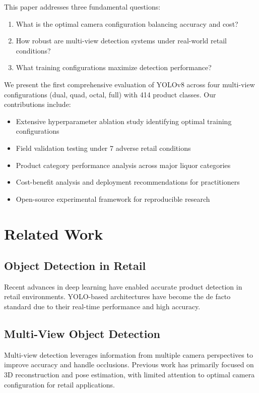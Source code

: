 \documentclass[conference]{IEEEtran}
\begin{document}
This paper addresses three fundamental questions:
\begin{enumerate}
    \item What is the optimal camera configuration balancing accuracy and cost?
    \item How robust are multi-view detection systems under real-world retail conditions?
    \item What training configurations maximize detection performance?
\end{enumerate}

We present the first comprehensive evaluation of YOLOv8 across four multi-view configurations (dual, quad, octal, full) with 414 product classes. Our contributions include:

\begin{itemize}
    \item Extensive hyperparameter ablation study identifying optimal training configurations
    \item Field validation testing under 7 adverse retail conditions
    \item Product category performance analysis across major liquor categories
    \item Cost-benefit analysis and deployment recommendations for practitioners
    \item Open-source experimental framework for reproducible research
\end{itemize}

\section{Related Work}
\subsection{Object Detection in Retail}
Recent advances in deep learning have enabled accurate product detection in retail environments. YOLO-based architectures \cite{yolov8} have become the de facto standard due to their real-time performance and high accuracy.

\subsection{Multi-View Object Detection}
Multi-view detection leverages information from multiple camera perspectives to improve accuracy and handle occlusions. Previous work has primarily focused on 3D reconstruction and pose estimation, with limited attention to optimal camera configuration for retail applications.
\end{document}
